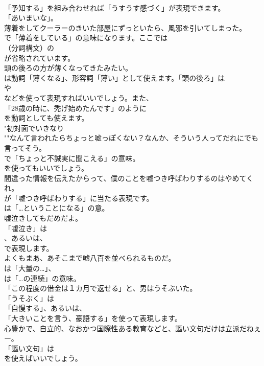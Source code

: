 \documentclass[8pt]{extreport}
\begin{document}
\begin{CJK}{UTF8}{min}
\\	「予知する」を組み合わせれば「うすうす感づく」が表現できます。
\\	「あいまいな」。	
\\	薄着をしてクーラーのきいた部屋にずっといたら、風邪を引いてしまった。 
\\	で「薄着をしている」の意味になります。ここでは
\\	（分詞構文）の
\\	が省略されています。	
\\	頭の後ろの方が薄くなってきたみたい。 
\\	は動詞「薄くなる」、形容詞「薄い」として使えます。「頭の後ろ」は
\\	や
\\	などを使って表現すればいいでしょう。また、
\\	「28歳の時に、禿げ始めたんです」のように
\\	を動詞としても使えます。	
\\	"初対面でいきなり
\\	""なんて言われたらちょっと嘘っぽくない？なんか、そういう人ってだれにでも言ってそう。 
\\	で「ちょっと不誠実に聞こえる」の意味。
\\	を使ってもいいでしょう。
\\	間違った情報を伝えたからって、僕のことを嘘つき呼ばわりするのはやめてくれ。 
\\	が「嘘つき呼ばわりする」に当たる表現です。
\\	は「…ということになる」の意。	
\\	嘘泣きしてもだめだよ。 
\\	「嘘泣き」は
\\	、あるいは、
\\	で表現します。	
\\	よくもまあ、あそこまで嘘八百を並べられるものだ。 
\\	は「大量の…」、
\\	は「…の連続」の意味。	
\\	「この程度の借金は１カ月で返せる」と、男はうそぶいた。 
\\	「うそぶく」は
\\	「自慢する」、あるいは、
\\	「大きいことを言う、豪語する」を使って表現します。	
\\	心豊かで、自立的、なおかつ国際性ある教育などと、謳い文句だけは立派だねぇー。 
\\	「謳い文句」は
\\	を使えばいいでしょう。

\end{CJK}
\end{document}
